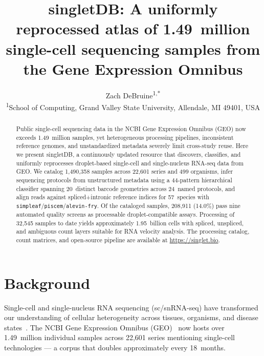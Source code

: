 \documentclass[10pt,twocolumn,letterpaper]{article}
\title{singletDB: A uniformly reprocessed atlas of 1.49~million single-cell
  sequencing samples from the Gene Expression Omnibus}
\author{
  Zach DeBruine\textsuperscript{1,*}
  \\[6pt]
  \textsuperscript{1}School of Computing, Grand Valley State University, Allendale, MI 49401, USA
}
\begin{document}
\maketitle
{}

\begin{abstract}
  Public single-cell sequencing data in the NCBI Gene Expression Omnibus (GEO)
  now exceeds 1.49~million samples, yet heterogeneous processing pipelines,
  inconsistent reference genomes, and unstandardized metadata severely limit
  cross-study reuse. Here we present singletDB, a continuously updated resource
  that discovers, classifies, and uniformly reprocesses droplet-based
  single-cell and single-nucleus RNA-seq data from GEO. We catalog 1,490,358
  samples across 22,601 series and 499 organisms, infer sequencing protocols
  from unstructured metadata using a 44-pattern hierarchical classifier
  spanning 20~distinct barcode geometries across 24~named protocols, and
  align reads against spliced+intronic reference indices for 57~species with
  \texttt{simpleaf}/\texttt{piscem}/\texttt{alevin-fry}. Of the cataloged
  samples, 208,911 (14.0\%) pass nine automated quality screens as
  processable droplet-compatible assays. Processing of 32,545 samples to date
  yields approximately 1.95~billion cells with spliced, unspliced, and
  ambiguous count layers suitable for RNA velocity analysis. The processing
  catalog, count matrices, and open-source pipeline are available at
  \url{https://singlet.bio}.
\end{abstract}


\section{Background}

Single-cell and single-nucleus RNA sequencing (sc/snRNA-seq) have
transformed our understanding of cellular heterogeneity across tissues,
organisms, and disease states~\citep{regev2017,tanay2017}. The NCBI Gene
Expression Omnibus (GEO)~\citep{edgar2002} now hosts over 1.49~million
individual samples across 22,601 series mentioning single-cell technologies
--- a corpus that doubles approximately every 18~months.
\end{document}

